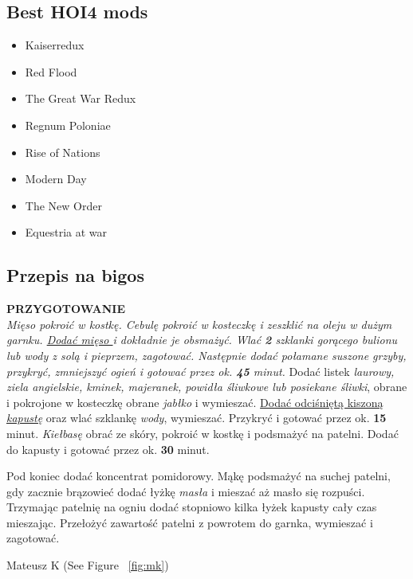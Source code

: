 \subsection{Best HOI4 mods}
\begin{itemize}
    \item Kaiserredux
    \item Red Flood
    \item The Great War Redux
    \item Regnum Poloniae
    \item Rise of Nations
    \item Modern Day
    \item The New Order
    \item Equestria at war
\end{itemize}

\subsection{Przepis na bigos}
\begin{center}
    \textbf{PRZYGOTOWANIE}\\
    \textit{Mięso pokroić w kostkę. \emph{Cebulę} pokroić w kosteczkę i zeszklić na oleju w dużym garnku. \underline{Dodać mięso }i dokładnie je obsmażyć. Wlać \textbf{2} szklanki gorącego \emph{bulionu lub wody z solą i pieprzem}, zagotować. Następnie dodać połamane suszone \emph{grzyby}, przykryć, zmniejszyć ogień i gotować przez ok. \textbf{45} minut.} Dodać listek \textit{laurowy, ziela angielskie, kminek, majeranek, powidła śliwkowe lub posiekane śliwki}, obrane i pokrojone w kosteczkę obrane \textit{jabłko} i wymieszać. \underline{ Dodać odciśniętą kiszoną \emph{kapustę}} oraz wlać szklankę \textit{wody}, wymieszać. Przykryć i gotować przez ok. \textbf{15} minut. \textit{Kiełbasę} obrać ze skóry, pokroić w kostkę i podsmażyć na patelni. Dodać do kapusty i gotować przez ok. \textbf{30} minut.
    
    Pod koniec dodać koncentrat pomidorowy. Mąkę podsmażyć na suchej patelni, gdy zacznie brązowieć dodać łyżkę \textit{masła} i mieszać aż masło się rozpuści. Trzymając patelnię na ogniu dodać stopniowo kilka łyżek kapusty cały czas mieszając. Przełożyć zawartość patelni z powrotem do garnka, wymieszać i zagotować.

    Mateusz K (See Figure ~\ref{fig:mk})

\end{center}

